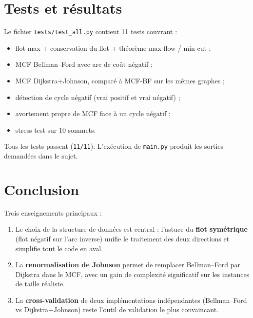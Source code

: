\documentclass[11pt,a4paper]{article}
\begin{document}
\section{Tests et résultats}

Le fichier \texttt{tests/test\_all.py} contient 11 tests couvrant :
\begin{itemize}
    \item flot max + conservation du flot + théorème max-flow / min-cut ;
    \item MCF Bellman--Ford avec arc de coût négatif ;
    \item MCF Dijkstra+Johnson, comparé à MCF-BF sur les mêmes graphes ;
    \item détection de cycle négatif (vrai positif et vrai négatif) ;
    \item avortement propre de MCF face à un cycle négatif ;
    \item stress test sur 10 sommets.
\end{itemize}
Tous les tests passent (\texttt{11/11}). L'exécution de
\texttt{main.py} produit les sorties demandées dans le sujet.

\section{Conclusion}

Trois enseignements principaux :
\begin{enumerate}
    \item Le choix de la structure de données est central : l'astuce du
        \textbf{flot symétrique} (flot négatif sur l'arc inverse) unifie
        le traitement des deux directions et simplifie tout le code en aval.
    \item La \textbf{renormalisation de Johnson} permet de remplacer
        Bellman--Ford par Dijkstra dans le MCF, avec un gain de
        complexité significatif sur les instances de taille réaliste.
    \item La \textbf{cross-validation} de deux implémentations
        indépendantes (Bellman--Ford vs Dijkstra+Johnson) reste l'outil
        de validation le plus convaincant.
\end{enumerate}
\end{document}
